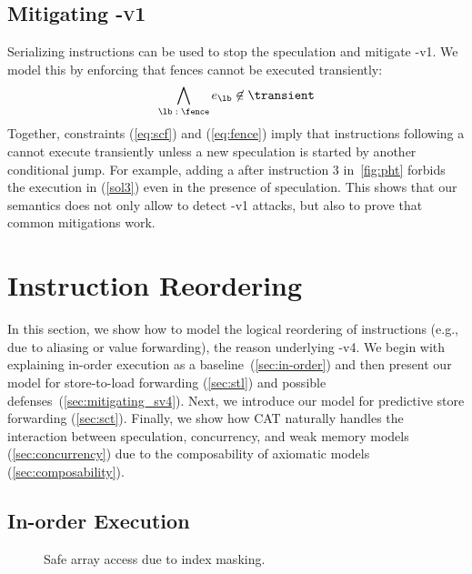 \documentclass[conference]{IEEEtran}
\begin{document}
\subsection{Mitigating \spectre-\textsc{v1}}
\label{sec:mit1}

Serializing instructions can be used to stop the speculation and mitigate \spectre-v1.
We model this by enforcing that fences cannot be executed transiently:
\begin{equation}
\label{eq:fence}
\bigwedge\limits_{\lb \; : \; \fence} e_\lb \not \in \transient
\end{equation}
Together, constraints (\ref{eq:scf}) and (\ref{eq:fence}) imply that instructions following a \fence cannot execute transiently unless a new speculation is started by another conditional jump.
For example, adding a \fence after instruction $3$ in~\autoref{fig:pht} forbids the execution in (\ref{sol3}) even in the presence of speculation.
This shows that our semantics does not only allow to detect \spectre-v1 attacks, but also to prove that common mitigations work.

\section{Instruction Reordering}
\label{sec:cat-models}

In this section, we show how to model the logical reordering of instructions (e.g., due to aliasing or value forwarding), the reason underlying \spectre-v4. We begin with explaining in-order execution as a baseline~(\autoref{sec:in-order}) and then present our model for store-to-load forwarding (\autoref{sec:stl}) and possible defenses~(\autoref{sec:mitigating_sv4}). Next, we introduce our model for predictive store forwarding (\autoref{sec:sct}).
Finally, we show how CAT naturally handles the interaction between speculation, concurrency, and weak memory models (\autoref{sec:concurrency}) due to the composability of axiomatic models (\autoref{sec:composability}).

\subsection{In-order Execution}
\label{sec:in-order}

\begin{figure}[t]
\centering
\scalebox{.8}{}
\caption{Safe array access due to index masking.}
\label{fig:stl-safe}
\end{figure}
\end{document}
